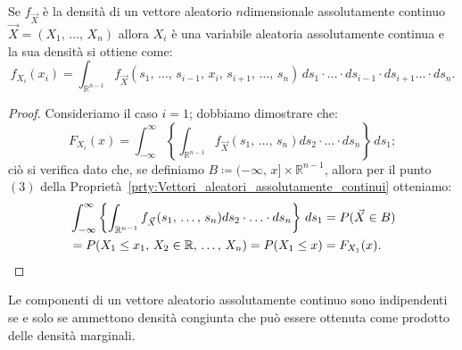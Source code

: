         \begin{prty}\label{prty:Densità_marginale_continua}
            Se $f_{\vec{X}}$ è la densità di un vettore aleatorio $n$\nbdash dimensionale assolutamente continuo $\vec{X} = (X_1,\, \ldots,\, X_{n})$ allora $X_i$ è una variabile aleatoria assolutamente continua e la sua densità si ottiene come: \[
                f_{X_i}(x_i) = \int_{\mathbb{R}^{n-1}} f_{\vec{X}}(s_1,\, \ldots,\, s_{i-1},\, x_i,\, s_{i+1},\, \ldots,\, s_n)\, ds_1 \cdot \ldots \cdot ds_{i-1} \cdot ds_{i+1} \ldots \cdot ds_n
            .\] 
        \end{prty}
        \begin{proof}
            Consideriamo il caso $i=1$; dobbiamo dimostrare che: \[
            F_{X_i}(x) = \int_{-\infty}^{\infty} \left\{\int_{\mathbb{R}^{n-1}} f_{\vec{X}}(s_1,\, \ldots,\, s_n) ds_2 \cdot \ldots \cdot ds_n\right\}\, ds_1
            ;\] ciò si verifica dato che, se definiamo $B \coloneqq (-\infty,\, x] \times \mathbb{R}^{n-1}$, allora per il punto $(3)$ della Proprietà~\ref{prty:Vettori_aleatori_assolutamente_continui} otteniamo:
            \begin{align*}
                &\int_{-\infty}^{\infty} \left\{\int_{\mathbb{R}^{n-1}} f_{\vec{X}}(s_1,\, \ldots,\, s_n) ds_2 \cdot \ldots \cdot ds_n\right\}\, ds_1 = P(\vec{X} \in B) \\
                &= P(X_1 \leq x_1,\, X_2 \in \mathbb{R},\, \ldots,\, X_n) = P(X_1 \leq x) = F_{X_1}(x) \qedhere
            .\end{align*}
        \end{proof}
        \begin{prty}
            Le componenti di un vettore aleatorio assolutamente continuo sono indipendenti se e solo se ammettono densità congiunta che può essere ottenuta come prodotto delle densità marginali.
        \end{prty}
